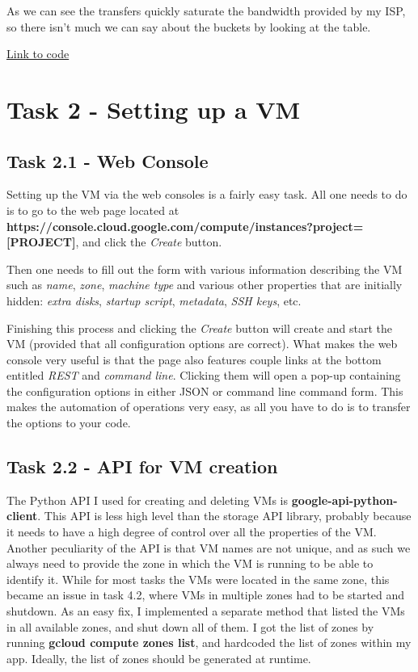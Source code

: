 \documentclass[paper=a4, fontsize=11pt]{scrartcl}
\numberwithin{equation}{section}    %
\numberwithin{figure}{section}      %
\numberwithin{table}{section}       %
\begin{document}
As we can see the transfers quickly saturate the bandwidth provided by my ISP, so there isn't much we can say about the buckets by looking at the table.

\href{https://github.com/valenting/id2210-cloud-project-2018/blob/master/test_storage.py}{Link to code}

\section{Task 2 - Setting up a VM}

\subsection{Task 2.1 - Web Console}

Setting up the VM via the web consoles is a fairly easy task.
All one needs to do is to go to the web page located at \textbf{https://console.cloud.google.com/compute/instances?project=[PROJECT]},
and click the \textit{Create} button.

Then one needs to fill out the form with various information describing the VM such as \textit{name}, \textit{zone}, \textit{machine type} and various other properties that are initially hidden:  \textit{extra disks}, \textit{startup script}, \textit{metadata}, \textit{SSH keys}, etc.

Finishing this process and clicking the \textit{Create} button will create and start the VM (provided that all configuration options are correct).
What makes the web console very useful is that the page also features couple links at the bottom entitled \textit{REST} and \textit{command line}. Clicking them will open a pop-up containing the configuration options in either JSON or command line command form.
This makes the automation of operations very easy, as all you have to do is to transfer the options to your code.

\subsection{Task 2.2 - API for VM creation}

The Python API I used for creating and deleting VMs is \textbf{google-api-python-client}.
This API is less high level than the storage API library, probably because it needs to have a high degree of control over all the properties of the VM.
Another peculiarity of the API is that VM names are not unique, and as such we always need to provide the zone in which the VM is running to be able to identify it.
While for most tasks the VMs were located in the same zone, this became an issue in task 4.2, where VMs in multiple zones had to be started and shutdown. As an easy fix, I implemented a separate method that listed the VMs in all available zones, and shut down all of them.
I got the list of zones by running \textbf{gcloud compute zones list}, and hardcoded the list of zones within my app. Ideally, the list of zones should be generated at runtime.
\end{document}
